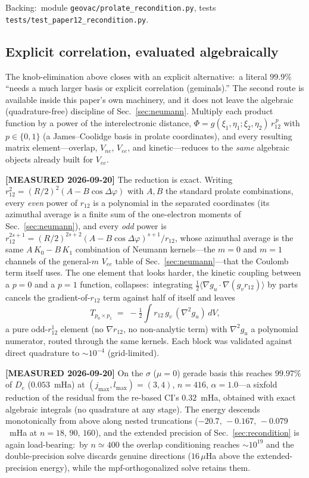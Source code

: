 \documentclass[aps,pra,twocolumn,superscriptaddress,longbibliography]{revtex4-2}
\newcommand{\gvq}[2]{#2}
\begin{document}
Backing:\ module \texttt{geovac/prolate\_recondition.py}, tests
\texttt{tests/test\_paper12\_recondition.py}.

\subsection{Explicit correlation, evaluated algebraically}
\label{sec:r12}

The knob-elimination above closes with an explicit alternative:\ a literal
$99.9\%$ ``needs a much larger basis or explicit correlation (geminals).''
The second route is available inside this paper's own machinery, and it
does not leave the algebraic (quadrature-free) discipline of
Sec.~\ref{sec:neumann}.  Multiply each product function by a power of the
interelectronic distance, $\Phi = g(\xi_1,\eta_1;\xi_2,\eta_2)\,r_{12}^{\,p}$
with $p\in\{0,1\}$ (a James--Coolidge basis in prolate coordinates), and
every resulting matrix element---overlap, $V_{ne}$, $V_{ee}$, and
kinetic---reduces to the \emph{same} algebraic objects already built for
$V_{ee}$.

\textbf{[MEASURED 2026-09-20]} The reduction is exact.  Writing
$r_{12}^2 = (R/2)^2(A - B\cos\Delta\varphi)$ with $A,B$ the standard
prolate combinations, every \emph{even} power of $r_{12}$ is a polynomial
in the separated coordinates (its azimuthal average is a finite sum of the
one-electron moments of Sec.~\ref{sec:neumann}), and every \emph{odd} power is
$r_{12}^{2s+1} = (R/2)^{2s+2}(A - B\cos\Delta\varphi)^{s+1}/r_{12}$, whose
azimuthal average is the same $A\,K_0 - B\,K_1$ combination of Neumann
kernels---the $m=0$ and $m=1$ channels of the general-$m$ $V_{ee}$ table
of Sec.~\ref{sec:neumann}---that the Coulomb term itself uses.  The one
element that looks harder, the kinetic coupling between a $p=0$ and a
$p=1$ function, collapses:\ integrating
$\tfrac12\langle\nabla g_u\!\cdot\!\nabla(g_v r_{12})\rangle$ by parts
cancels the gradient-of-$r_{12}$ term against half of itself and leaves
\begin{equation}
  T_{p_0\times p_1} \;=\; -\tfrac12\!\int r_{12}\,g_v\,(\nabla^2 g_u)\,dV,
  \label{eq:r12_kinetic_collapse}
\end{equation}
a pure odd-$r_{12}^{1}$ element (no $\nabla r_{12}$, no non-analytic term)
with $\nabla^2 g_u$ a polynomial numerator, routed through the same
kernels.  Each block was validated against direct quadrature to
$\sim\!10^{-4}$ (grid-limited).

\textbf{[MEASURED 2026-09-20]} On the $\sigma$ ($\mu=0$) gerade basis this
reaches $\gvq{p12_r12_de_pct}{99.97}\%$ of $D_e$
($\gvq{p12_r12_err_mha}{0.053}$~mHa) at $(j_{\max},l_{\max})=(3,4)$,
$n=416$, $\alpha = 1.0$---a sixfold reduction of the residual from the
re-based CI's $\gvq{p12_rebased_err_mha_aopt}{0.32}$~mHa, obtained with
exact algebraic integrals (no quadrature at any stage).  The energy
descends monotonically from above along nested truncations
($-20.7,\,-0.167,\,-0.079$~mHa at $n = 18,\,90,\,160$), and the extended
precision of Sec.~\ref{sec:recondition} is again load-bearing:\ by
$n\simeq 400$ the overlap conditioning reaches $\sim\!10^{19}$ and the
double-precision solve discards genuine directions
($16\,\mu$Ha above the extended-precision energy), while the
mpf-orthogonalized solve retains them.
\end{document}
